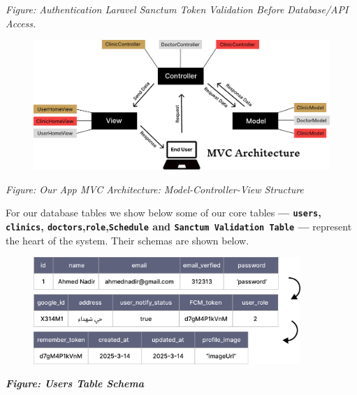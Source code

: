\documentclass[12pt]{report}
\begin{document}
\begin{center}
	\vspace*{0.3cm}
	\textit{Figure: Authentication Laravel Sanctum Token Validation Before Database/API Access.}
\end{center}
\vspace*{0.8cm}
\begin{figure}[H]
	\centering
	\includegraphics[width=1\textwidth]{images/MVC@2x.pdf}
\end{figure}
\begin{center}
	\vspace*{0.3cm}
	\textit{Figure: Our App MVC Architecture: Model-Controller-View Structure }
\end{center}


\newpage
\noindent For our database tables we show below some of our core tables \textbf{— \texttt{users}, \texttt{clinics}, \texttt{doctors},\texttt{role},\texttt{Schedule} and \texttt{Sanctum Validation Table} — }represent the heart of the system. Their schemas are shown below.
\vspace*{0.5cm}
\begin{figure}[H]
	\centering
	\includegraphics[width=0.9\textwidth]{images/user_table.pdf}
\end{figure}
\begin{center}
	
	\textbf{\textit{Figure: Users Table Schema}}
\end{center}
\end{document}
